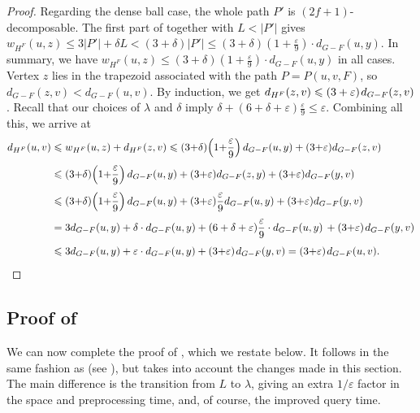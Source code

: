 \documentclass{theoretics}
\newcommand{\RestateGo}[1]{\renewcommand{#1}{(Restated)}}
\newcommand*{\length}[1]{|#1|}
\newcommand*{\nwspace}{\hspace*{.1em}}
\renewcommand{\le}{\leqslant}
\newcommand{\eps}{\varepsilon}
\begin{document}
\begin{proof}
  	Regarding the dense ball case, the whole path $P'$ is $(2f{+}1)$-decomposable.
	The first part of 
	together with $L < \length{P'}$ gives
	$w_{H^F}(u,z) \le 3 \length{P'} + \delta L < (3+\delta) \length{P'} \le
	(3+\delta)(1+ \tfrac{\eps}{9}) \cdot d_{G-F}(u,y)$.
%	
	In summary, we have $w_{H^F}(u,z) \le (3+\delta)(1+ \tfrac{\eps}{9}) \cdot d_{G-F}(u,y)$
	in all cases.
	Vertex $z$ lies in the trapezoid associated with the path $P = P(u,v,F)$,
	so $d_{G-F}(z,v) < d_{G-F}(u,v)$.
	By induction, we get $d_{H^F}(z,v) \le (3+\varepsilon) \nwspace d_{G-F}(z,v)$.
	Recall that our choices of $\lambda$ and $\delta$ imply
	$\delta +  (6 + \delta + \varepsilon) \frac{\varepsilon}{9} \le \varepsilon$.
	Combining all this, we arrive at
	\begin{align*}
    d_{H^F}(u,v) &\le w_{H^F}(u,z) + d_{H^F}(z,v)
       \le (3{+}\delta)\! \left(1{+}\frac{\varepsilon}{9}\right)  d_{G-F}(u,y)
        + (3{+}\eps)  d_{G-F}(z,v)\\[.33em]
      &\le (3{+}\delta)\! \left(1{+}\frac{\varepsilon}{9}\right)  d_{G-F}(u,y)
        + (3{+}\eps)  d_{G-F}(z,y) + (3{+}\eps)  d_{G-F}(y,v)\\[.33em]
      &\le (3{+}\delta)\! \left(1{+}\frac{\varepsilon}{9}\right)  d_{G-F}(u,y)
        + (3{+}\eps)\frac{\varepsilon}{9}  d_{G-F}(u,y) + (3{+}\eps)  d_{G-F}(y,v)\\[.33em]
      &= 3 d_{G-F}(u,y) + \delta \cdot d_{G-F}(u,y) +
       (6 + \delta + \varepsilon) \frac{\varepsilon}{9} \cdot d_{G-F}(u,y)\, +
      	(3{+}\eps) \nwspace d_{G-F}(y,v)\\[.33em]
      &\le 3 d_{G-F}(u,y) + \varepsilon \cdot  d_{G-F}(u,y) + (3{+}\eps) \nwspace d_{G-F}(y,v)
       = (3{+}\eps) \nwspace d_{G-F}(u,v). \qedhere
\end{align*}
\end{proof}


\subsection{Proof of \texorpdfstring{}{Theorem 1.1}}
\label{subsec:proof_main_theorem}

We can now complete the proof of , which we restate below.
It follows in the same fashion as 
(see ),
but takes into account the changes made in this section.
The main difference is the transition from $L$ to $\lambda$,
giving an extra $1/\varepsilon$ factor in the space and preprocessing time,
and, of course, the improved query time.
\RestateGo{\restateoraclelongpaths}
\oraclelongpaths*
\end{document}
